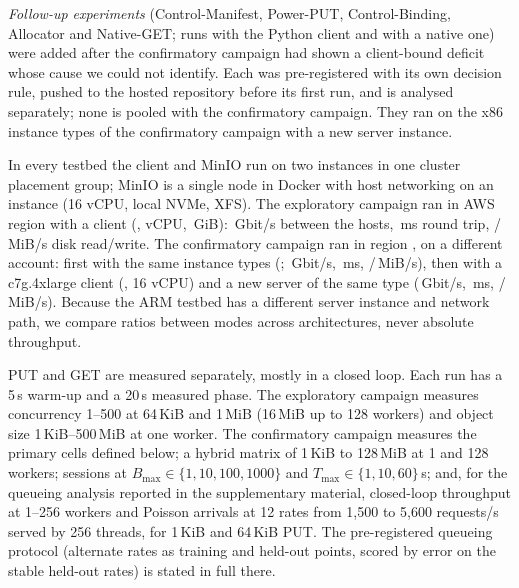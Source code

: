 \documentclass[conference]{IEEEtran}
\newcommand{\lab}[1]{\textsf{#1}}
\begin{document}
\begin{table}[t]
\caption{Exploratory campaign: runs, requests and the results each batch supplies (batch identifiers as in Table~\ref{tab:batches})}
\label{tab:sources}
\centering\footnotesize

\end{table}

\emph{Follow-up experiments} (\lab{Control-Manifest}, \lab{Power-PUT}, \lab{Control-Binding},
\lab{Allocator} and \lab{Native-GET}; \AudRuns{} runs with the Python client and \AudNRuns{}
with a native one) were added after the confirmatory campaign had shown a client-bound deficit
whose cause we could not identify. Each was pre-registered with its own decision rule, pushed to
the hosted repository before its first run, and is analysed separately; none is pooled with
the confirmatory campaign. They ran on the x86 instance types of the confirmatory campaign with a new server
instance.

In every testbed the client and MinIO run on two instances in one cluster placement group; MinIO
is a single node in Docker with host networking on an \ServerType{} instance (16 vCPU, local
NVMe, XFS). The exploratory campaign ran in AWS region \Region{} with a \ClientType{} client
(\ClientCPU, \ClientVCPU{} vCPU, \ClientRAMGiB\,GiB): \LinkGbit\,Gbit/s between the hosts,
\RTTms\,ms round trip, \FioReadMiB/\FioWriteMiB\,MiB/s disk read/write. The confirmatory campaign
ran in region \RevRegion, on a different account: first with the same instance types
(\RevClientCPU; \RevLinkGbit\,Gbit/s, \RevRtt\,ms, \RevDiskRead/\RevDiskWrite\,MiB/s), then with a
c7g.4xlarge client (\ArmClientCPU, 16 vCPU) and a new server of the same type
(\ArmLinkGbit\,Gbit/s, \ArmRtt\,ms, \ArmDiskRead/\ArmDiskWrite\,MiB/s). Because the ARM testbed
has a different server instance and network path, we compare ratios between modes across
architectures, never absolute throughput.

PUT and GET are measured separately, mostly in a closed loop. Each run has a 5\,s warm-up and a
20\,s measured phase. The exploratory campaign measures concurrency 1--500 at 64\,KiB and
1\,MiB (16\,MiB up to 128 workers) and object size 1\,KiB--500\,MiB at one worker. The
confirmatory campaign measures the primary cells defined below; a hybrid matrix of 1\,KiB to
128\,MiB at 1 and 128 workers; sessions at $B_{\max}\in\{1,10,100,1000\}$ and
$T_{\max}\in\{1,10,60\}$\,s; and, for the queueing analysis reported in the supplementary
material, closed-loop throughput at 1--256 workers and Poisson arrivals at 12 rates from
1{,}500 to 5{,}600 requests/s served by 256 threads, for 1\,KiB and 64\,KiB PUT. The
pre-registered queueing protocol (alternate rates as training and held-out points, scored by
error on the stable held-out rates) is stated in full there.
\end{document}
